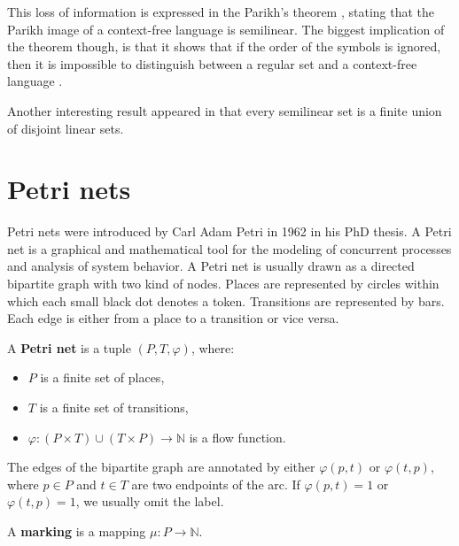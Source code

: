 This loss of information is expressed in the Parikh's theorem \cite{Parikh66}, stating that the Parikh image of a context-free language is semilinear. The biggest implication of the theorem though, is that it shows that if the order of the symbols is ignored, then it is impossible to distinguish between a regular set and a context-free language \cite{Kozen97Automata}.

Another interesting result appeared in \cite{Ito69Semilinear} that every semilinear set is a finite union of disjoint linear sets.



\section{Petri nets} %
\label{sec:petri_nets}

Petri nets \cite{Petri62,Yen06PetriNets} were introduced by Carl Adam Petri in 1962 in his PhD thesis. A Petri net is a graphical and mathematical tool for the modeling of concurrent processes and analysis of system behavior. A Petri net is usually drawn as a directed bipartite graph with two kind of nodes. Places are represented by circles within which each small black dot denotes a token. Transitions are represented by bars. Each edge is either from a place to a transition or vice versa.

\begin{definition}
  A {\bf Petri net} is a tuple $(P, T, \varphi)$, where:
  \begin{itemize}
    \item $P$ is a finite set of places,
    \item $T$ is a finite set of transitions,
    \item $\varphi: (P\times T)\cup(T\times P)\rightarrow \mathbb N$ is a flow function.
  \end{itemize}
\end{definition}

The edges of the bipartite graph are annotated by either $\varphi(p,t)$ or $\varphi(t,p)$, where $p\in P$ and $t\in T$ are two endpoints of the arc. If $\varphi(p,t)=1$ or $\varphi(t,p)=1$, we usually omit the label.

\begin{definition}
  A {\bf marking} is a mapping $\mu: P\rightarrow \mathbb N$.
\end{definition}

